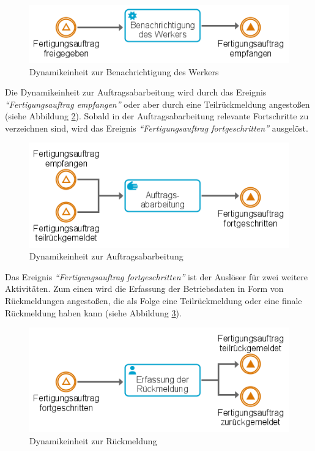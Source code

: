 \begin{figure}[H]
	\centering 
    \includegraphics[width=.7\textwidth]{img/freigabeeinheit.png}	
    \caption[Dynamikeinheit zur Benachrichtigung des Werkers]
    {Dynamikeinheit zur Benachrichtigung des Werkers\protect\footnotemark}
    \label{fig:Dynamikeinheit zur Benachrichtigung des Werkers}
\end{figure}

Die Dynamikeinheit zur Auftragsabarbeitung wird durch das Ereignis \textit{\enquote{Fertigungsauftrag empfangen}} oder aber durch eine Teilrückmeldung angestoßen (siehe Abbildung \ref{fig:Dynamikeinheit zur Auftragsabarbeitung}). Sobald in der Auftragsabarbeitung relevante Fortschritte zu verzeichnen sind, wird das Ereignis \textit{\enquote{Fertigungsauftrag fortgeschritten}} ausgelöst.

\begin{figure}[H]
	\centering 
    \includegraphics[width=.7\textwidth]{img/abarbeitungseinheit.png}	
    \caption[Dynamikeinheit zur Auftragsabarbeitung]
    {Dynamikeinheit zur Auftragsabarbeitung\protect\footnotemark}
    \label{fig:Dynamikeinheit zur Auftragsabarbeitung}
\end{figure}

Das Ereignis \textit{\enquote{Fertigungsauftrag fortgeschritten}} ist der Auslöser für zwei weitere Aktivitäten.
Zum einen wird die Erfassung der Betriebsdaten in Form von Rückmeldungen angestoßen, die als Folge eine Teilrückmeldung oder eine finale Rückmeldung haben kann (siehe Abbildung \ref{fig:Dynamikeinheit zur Rückmeldung}).

\begin{figure}[H]
	\centering 
    \includegraphics[width=.7\textwidth]{img/ruckmeldeeinheit.png}	
    \caption[Dynamikeinheit zur Rückmeldung]
    {Dynamikeinheit zur Rückmeldung\protect\footnotemark}
    \label{fig:Dynamikeinheit zur Rückmeldung}
\end{figure}

